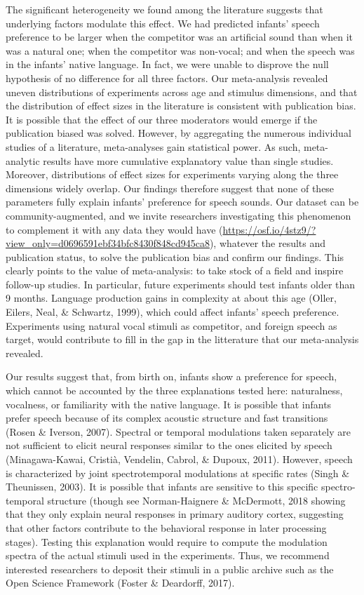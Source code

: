 \documentclass[
  man]{apa6}
\begin{document}
The significant heterogeneity we found among the literature suggests that underlying factors modulate this effect. We had predicted infants' speech preference to be larger when the competitor was an artificial sound than when it was a natural one; when the competitor was non-vocal; and when the speech was in the infants' native language. In fact, we were unable to disprove the null hypothesis of no difference for all three factors. Our meta-analysis revealed uneven distributions of experiments across age and stimulus dimensions, and that the distribution of effect sizes in the literature is consistent with publication bias. It is possible that the effect of our three moderators would emerge if the publication biased was solved. However, by aggregating the numerous individual studies of a literature, meta-analyses gain statistical power. As such, meta-analytic results have more cumulative explanatory value than single studies. Moreover, distributions of effect sizes for experiments varying along the three dimensions widely overlap. Our findings therefore suggest that none of these parameters fully explain infants' preference for speech sounds. Our dataset can be community-augmented, and we invite researchers investigating this phenomenon to complement it with any data they would have (\url{https://osf.io/4stz9/?view_only=d0696591ebf34bfc8430f848cd945ca8}), whatever the results and publication status, to solve the publication bias and confirm our findings.
This clearly points to the value of meta-analysis: to take stock of a field and inspire follow-up studies. In particular, future experiments should test infants older than 9 months. Language production gains in complexity at about this age (Oller, Eilers, Neal, \& Schwartz, 1999), which could affect infants' speech preference. Experiments using natural vocal stimuli as competitor, and foreign speech as target, would contribute to fill in the gap in the litterature that our meta-analysis revealed.

Our results suggest that, from birth on, infants show a preference for speech, which cannot be accounted by the three explanations tested here: naturalness, vocalness, or familiarity with the native language. It is possible that infants prefer speech because of its complex acoustic structure and fast transitions (Rosen \& Iverson, 2007). Spectral or temporal modulations taken separately are not sufficient to elicit neural responses similar to the ones elicited by speech (Minagawa-Kawai, Cristià, Vendelin, Cabrol, \& Dupoux, 2011). However, speech is characterized by joint spectrotemporal modulations at specific rates (Singh \& Theunissen, 2003). It is possible that infants are sensitive to this specific spectro-temporal structure (though see Norman-Haignere \& McDermott, 2018 showing that they only explain neural responses in primary auditory cortex, suggesting that other factors contribute to the behavioral response in later processing stages). Testing this explanation would require to compute the modulation spectra of the actual stimuli used in the experiments. Thus, we recommend interested researchers to deposit their stimuli in a public archive such as the Open Science Framework (Foster \& Deardorff, 2017).
\end{document}
